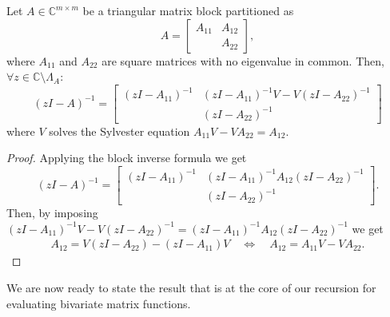 \documentclass{siamart1116}
\begin{document}
\begin{lemma}\label{lem:tech}
	Let $A\in\mathbb C^{m\times m}$ be a triangular matrix block partitioned as
	$$
	A=\begin{bmatrix}
	A_{11}& A_{12}\\
	& A_{22}
	\end{bmatrix}
	,
	$$
	where $A_{11}$ and $A_{22}$ are square matrices with no eigenvalue in common.
	Then, $\forall z\in\mathbb C\setminus \Lambda_A$:
	$$
	(zI-A)^{-1}=\begin{bmatrix}
	(zI-A_{11})^{-1}& (zI-A_{11})^{-1}V-V(zI-A_{22})^{-1}\\
	& (zI-A_{22})^{-1}
	\end{bmatrix}
	$$
	where $V$ solves the Sylvester equation
	$A_{11}V-VA_{22}=A_{12}$.
\end{lemma}
\begin{proof}
	Applying the block inverse formula we get 
	$$
	(zI-A)^{-1}=\begin{bmatrix}
	(zI-A_{11})^{-1}& (zI-A_{11})^{-1}A_{12}(zI-A_{22})^{-1}\\
	& (zI-A_{22})^{-1}
	\end{bmatrix}.
	$$
	Then, by imposing $(zI-A_{11})^{-1}V-V(zI-A_{22})^{-1}= (zI-A_{11})^{-1}A_{12}(zI-A_{22})^{-1}$ we get
	\begin{align*}
	A_{12}= V(zI-A_{22})-(zI-A_{11})V
	\quad \iff \quad 
	A_{12}=A_{11}V-VA_{22}.
	\end{align*}
\end{proof}
We are now ready to state the result that is at the core of our recursion for evaluating bivariate matrix functions.
\end{document}
